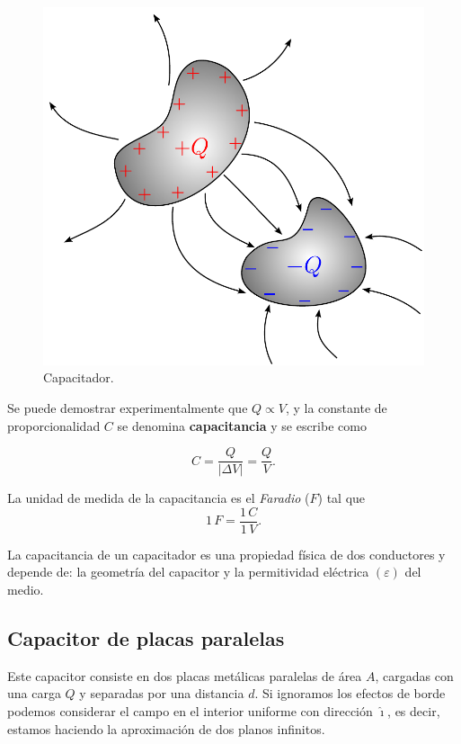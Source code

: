 \begin{figure}
    \centering
    \includegraphics[scale = 0.55]{Figuras/Capacitador.pdf}
    \caption{Capacitador.}
    \label{fig:capacitador}
\end{figure}

Se puede demostrar experimentalmente que $Q \varpropto V$, y la constante de proporcionalidad $C$ se denomina \textbf{capacitancia} y se escribe como
\begin{shaded}
    $$C = \frac{Q}{|\Delta V|} = \frac{Q}{V}.$$
\end{shaded}

La unidad de medida de la capacitancia es el \textit{Faradio} ($F$) tal que
$$1 \,F  = \frac{1 \,C}{1\,V}.$$

La capacitancia de un capacitador es una propiedad física de dos conductores y depende de: la geometría del capacitor y la permitividad eléctrica $(\varepsilon)$ del medio.

\subsection*{Capacitor de placas paralelas}

Este capacitor consiste en dos placas metálicas paralelas de área $A$, cargadas con una carga $Q$ y separadas por una distancia $d$. Si ignoramos los efectos de borde podemos considerar el campo en el interior uniforme con dirección $\hat{\imath}$, es decir, estamos haciendo la aproximación de dos planos infinitos. 

